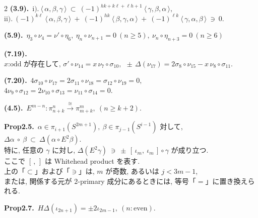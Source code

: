 \documentclass[10pt, leqno]{ltjsarticle}
\newcommand{\todas}[1]{\langle\,#1\,\rangle}
\newcommand{\pit}[2]{\pi_{#1}^{#2}}
\numberwithin{equation}{section}
\theoremstyle{plain}
\theoremstyle{definition}
\theoremstyle{remark}
\begin{document}
\begin{paracol}{2}
\noindent
\textbf{(3.9).}\
\(\text{i).}\ \todas{\alpha,\beta,\gamma}\ \subset\
(-1)^{hk+k\ell+\ell h+1}\ \todas{\gamma,\beta,\alpha},\)\\
\(\text{ii).}\ (-1)^{k\ell}\ \todas{\alpha,\beta,\gamma}\ +\
(-1)^{hk}\ \todas{\beta,\gamma,\alpha}\ +\
(-1)^{\ell k}\ \todas{\gamma,\alpha,\beta}\ \ni\ 0 .\)

\noindent
\textbf{(5.9).}\
\(\eta_3\circ \nu_4= \nu'\circ \eta_6,\
\eta_n\circ \nu_{n+1}=0\ (n\ge5),\
\nu_n\circ \eta_{n+3}=0\ (n\ge6)\)

\noindent
\textbf{(7.19).}\
\(x \text{:odd が存在して, }
\sigma'\circ \nu_{14}=x\,\nu_{7}\circ\sigma_{10},\ \
\pm\,\Delta(\nu_{17})=2\sigma_{8}\circ \nu_{15}-x\,\nu_{8}\circ\sigma_{11} .\)

\noindent
\textbf{(7.20).}\
\(4\sigma_{10}\circ\nu_{17}
=2\sigma_{11}\circ\nu_{18}
=\sigma_{12}\circ\nu_{19}=0,\)\\
\(4\nu_{9}\circ\sigma_{12}
=2\nu_{10}\circ\sigma_{13}
=\nu_{11}\circ\sigma_{14}=0.\)

\noindent
\textbf{(4.5).}\
\(E^{m-n}:\pit{n+k}{n}\xrightarrow{\cong}\pit{m+k}{m},\
(n\ge k+2). \)

\noindent
\textbf{Prop2.5.}\
$\alpha\in\pi_{i+1}(S^{2m+1}), \ \beta\in \pi_{j-1}(S^{i-1})$ 対して, 
\(
\Delta\alpha\ \circ\ \beta\ \subset\ \Delta(\alpha\circ E^2\beta).
\)\\
特に, 任意の $\gamma$ に対し,
\(
\Delta(E^2\gamma)\ \ni\ \pm\,[\,\iota_m,\ \iota_m\,]\circ\gamma
\)
が成り立つ. \\
ここで $[\, ,\,]$ は Whitehead product を表す. \\
上の「$\subset$」および「$\ni$」は, $m$ が奇数, 
あるいは $j<3m-1$, \\
または, 関係する元が \(2\)-primary 成分にあるときには, 
等号「$=$」に置き換えられる. 

\noindent
\textbf{Prop2.7.}\
\(H\Delta(\iota_{2n+1}) = \pm2\iota_{2m-1},\ (n:\text{even})\).







\end{paracol}

\newpage
\end{document}
